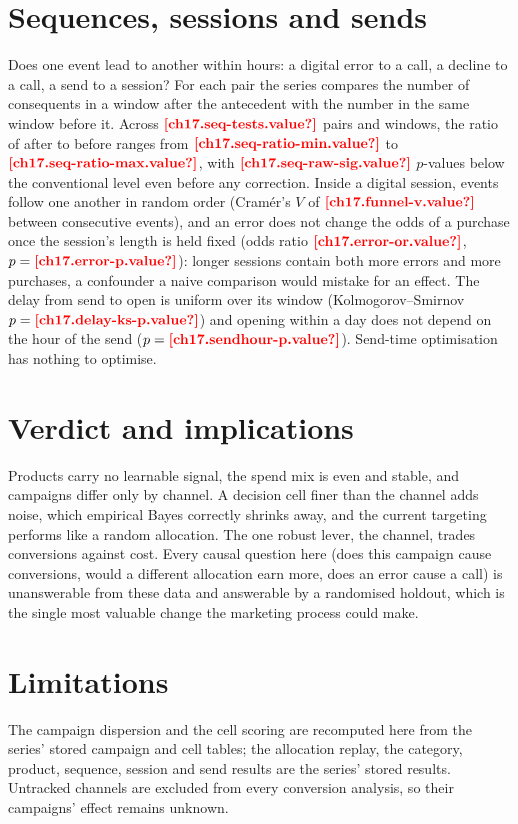 \section{Sequences, sessions and sends}\label{sec:pc-sequences}

Does one event lead to another within hours: a digital error to a call, a decline to a call, a send to a session? For each
pair the series compares the number of consequents in a window after the antecedent with the number in the same window before
it. Across $\est{ch17.seq-tests}{value}$ pairs and windows, the ratio of after to before ranges from
$\est{ch17.seq-ratio-min}{value}$ to $\est{ch17.seq-ratio-max}{value}$, with $\est{ch17.seq-raw-sig}{value}$ $p$-values below the
conventional level even before any correction. Inside a digital session, events follow one another in random order
(Cram\'er's $V$ of $\est{ch17.funnel-v}{value}$ between consecutive events), and an error does not change the odds of a purchase
once the session's length is held fixed (odds ratio $\est{ch17.error-or}{value}$, $p = \est{ch17.error-p}{value}$): longer
sessions contain both more errors and more purchases, a confounder a naive comparison would mistake for an effect. The delay
from send to open is uniform over its window (Kolmogorov--Smirnov $p = \est{ch17.delay-ks-p}{value}$) and opening within a day
does not depend on the hour of the send ($p = \est{ch17.sendhour-p}{value}$). Send-time optimisation has nothing to optimise.

\section{Verdict and implications}\label{sec:pc-verdict}

Products carry no learnable signal, the spend mix is even and stable, and campaigns differ only by channel. A decision cell
finer than the channel adds noise, which empirical Bayes correctly shrinks away, and the current targeting performs like a
random allocation. The one robust lever, the channel, trades conversions against cost. Every causal question here (does this
campaign cause conversions, would a different allocation earn more, does an error cause a call) is unanswerable from these
data and answerable by a randomised holdout, which is the single most valuable change the marketing process could make.

\section{Limitations}\label{sec:pc-limits}

The campaign dispersion and the cell scoring are recomputed here from the series' stored campaign and cell tables; the
allocation replay, the category, product, sequence, session and send results are the series' stored results. Untracked
channels are excluded from every conversion analysis, so their campaigns' effect remains unknown.
